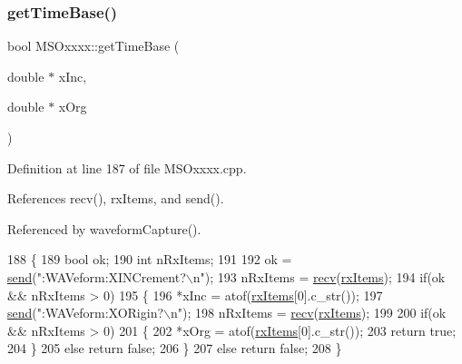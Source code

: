 \subsubsection{\texorpdfstring{get\+Time\+Base()}{getTimeBase()}}
{\footnotesize\ttfamily bool M\+S\+Oxxxx\+::get\+Time\+Base (\begin{DoxyParamCaption}\item[{double $\ast$}]{x\+Inc,  }\item[{double $\ast$}]{x\+Org }\end{DoxyParamCaption})\hspace{0.3cm}{\ttfamily [private]}}



Definition at line 187 of file M\+S\+Oxxxx.\+cpp.



References recv(), rx\+Items, and send().



Referenced by waveform\+Capture().


\begin{DoxyCode}
188 \{
189     \textcolor{keywordtype}{bool} ok;
190     \textcolor{keywordtype}{int} nRxItems;
191 
192     ok = \hyperlink{classMSOxxxx_ae77668a1ae4ccb74e0ed5f2485dfdebf}{send}(\textcolor{stringliteral}{":WAVeform:XINCrement?\(\backslash\)n"});
193     nRxItems = \hyperlink{classMSOxxxx_aa02e46a61e287ef1f5377e9e42399faf}{recv}(\hyperlink{classMSOxxxx_a847cae37181e9ec5f481edcc3fb19b1a}{rxItems});
194     \textcolor{keywordflow}{if}(ok && nRxItems > 0)
195     \{
196         *xInc = atof(\hyperlink{classMSOxxxx_a847cae37181e9ec5f481edcc3fb19b1a}{rxItems}[0].c\_str());
197         \hyperlink{classMSOxxxx_ae77668a1ae4ccb74e0ed5f2485dfdebf}{send}(\textcolor{stringliteral}{":WAVeform:XORigin?\(\backslash\)n"});       
198         nRxItems = \hyperlink{classMSOxxxx_aa02e46a61e287ef1f5377e9e42399faf}{recv}(\hyperlink{classMSOxxxx_a847cae37181e9ec5f481edcc3fb19b1a}{rxItems});
199 
200         \textcolor{keywordflow}{if}(ok && nRxItems > 0)
201         \{
202             *xOrg = atof(\hyperlink{classMSOxxxx_a847cae37181e9ec5f481edcc3fb19b1a}{rxItems}[0].c\_str());
203             \textcolor{keywordflow}{return} \textcolor{keyword}{true};
204         \}
205         \textcolor{keywordflow}{else} \textcolor{keywordflow}{return} \textcolor{keyword}{false};
206     \}
207     \textcolor{keywordflow}{else} \textcolor{keywordflow}{return} \textcolor{keyword}{false};
208 \}
\end{DoxyCode}
\mbox{\label{classMSOxxxx_a8c22ff23297ada963eaf12b6e0b62017}} 
